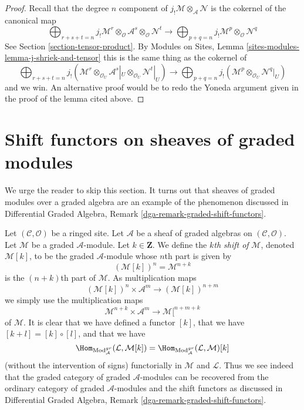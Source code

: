 \begin{proof}
Recall that the degree $n$ component of
$j_!\mathcal{M} \otimes_\mathcal{A} \mathcal{N}$ is the cokernel of
the canonical map
$$
\bigoplus\nolimits_{r + s + t = n}
j_!\mathcal{M}^r \otimes_\mathcal{O}
\mathcal{A}^s \otimes_\mathcal{O}
\mathcal{N}^t
\longrightarrow
\bigoplus\nolimits_{p + q = n}
j_!\mathcal{M}^p \otimes_\mathcal{O} \mathcal{N}^q
$$
See Section \ref{section-tensor-product}.
By Modules on Sites, Lemma \ref{sites-modules-lemma-j-shriek-and-tensor}
this is the same thing as the cokernel of
$$
\bigoplus\nolimits_{r + s + t = n}
j_!(\mathcal{M}^r \otimes_{\mathcal{O}_U}
\mathcal{A}^s|_U \otimes_{\mathcal{O}_U}
\mathcal{N}^t|_U)
\longrightarrow
\bigoplus\nolimits_{p + q = n}
j_!(\mathcal{M}^p \otimes_{\mathcal{O}_U} \mathcal{N}^q|_U)
$$
and we win. An alternative proof would be to redo the Yoneda
argument given in the proof of the lemma cited above.
\end{proof}








\section{Shift functors on sheaves of graded modules}
\label{section-shift}

\noindent
We urge the reader to skip this section. It turns out that sheaves
of graded modules over a graded algebra are an example of the phenomenon
discussed in
Differential Graded Algebra, Remark \ref{dga-remark-graded-shift-functors}.

\medskip\noindent
Let $(\mathcal{C}, \mathcal{O})$ be a ringed site.
Let $\mathcal{A}$ be a sheaf of graded algebras
on $(\mathcal{C}, \mathcal{O})$.
Let $\mathcal{M}$ be a graded $\mathcal{A}$-module. Let $k \in \mathbf{Z}$.
We define the {\it $k$th shift of} $\mathcal{M}$, denoted $\mathcal{M}[k]$,
to be the graded $\mathcal{A}$-module whose $n$th part is given by
$$
(\mathcal{M}[k])^n = \mathcal{M}^{n + k}
$$
is the $(n + k)$th part of $\mathcal{M}$. As multiplication maps
$$
(\mathcal{M}[k])^n \times \mathcal{A}^m
\longrightarrow
(\mathcal{M}[k])^{n + m}
$$
we simply use the multiplication maps
$$
\mathcal{M}^{n + k} \times \mathcal{A}^m
\longrightarrow
\mathcal{M}[^{n + m + k}
$$
of $\mathcal{M}$. It is clear that we have defined a functor $[k]$,
that we have $[k + l] = [k] \circ [l]$, and that we have
$$
\Hom_{\text{Mod}^{gr}_\mathcal{A}}(\mathcal{L}, \mathcal{M}[k]) =
\Hom_{\text{Mod}^{gr}_\mathcal{A}}(\mathcal{L}, \mathcal{M})[k]
$$
(without the intervention of signs)
functorially in $\mathcal{M}$ and $\mathcal{L}$.
Thus we see indeed that the graded category of graded $\mathcal{A}$-modules
can be recovered from the ordinary category of graded $\mathcal{A}$-modules
and the shift functors as discussed in 
Differential Graded Algebra, Remark \ref{dga-remark-graded-shift-functors}.

